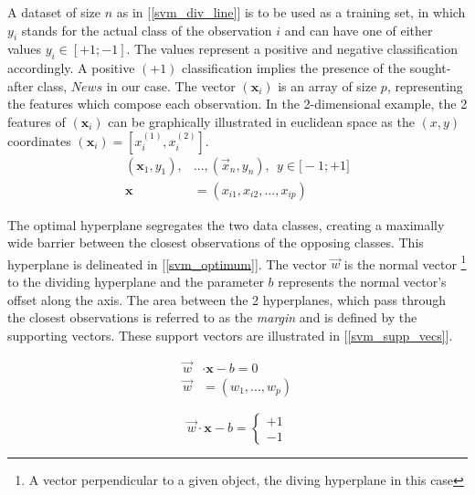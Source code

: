  A dataset of size $n$ as in [\ref{svm_div_line}] is to be used as a training set, in which $y_i$ stands for the actual class of the observation $i$ and can have one of either values $y_i \in [+1;-1] $. The values represent a positive and negative classification accordingly. A positive $(+1)$ classification implies the presence of the sought-after class, $News$ in our case. The vector $(\textbf{x}_i)$ is an array of size $p$, representing the features which compose each observation. In the 2-dimensional example, the 2 features of $(\textbf{x}_i)$ can be graphically illustrated in euclidean space as the $(x,y)$ coordinates $(\textbf{x}_i) = [x_i^{(1)},x_i^{(2)}]$. 
	\begin{equation}
		\begin{aligned}
			(\textbf{x}_1,y_1),& ... , (\vec{x}_n,y_n), \ \ y \in \big[-1;+1 \big] \\
			\textbf{x}& = (x_{i1},x_{i2}, ...,x_{ip})
		\end{aligned}
	\label{svm_div_line}
	\end{equation}
	
	The optimal hyperplane segregates the two data classes, creating a maximally wide barrier between the closest observations of the opposing classes. This hyperplane is delineated in [\ref{svm_optimum}]. The vector $\vec{w}$ is the normal vector \footnote{A vector perpendicular to a given object, the diving hyperplane in this case} to the dividing hyperplane and the parameter $b$ represents the normal vector's offset along the axis. The area between the 2 hyperplanes, which pass through the closest observations is referred to as the \textit{margin} and is defined by the supporting vectors. These support vectors are illustrated in [\ref{svm_supp_vecs}].
	
	\begin{equation}
		\begin{aligned}
			\vec{w}& \cdot \textbf{x} - b = 0 \\
			\vec{w}& = (w_1, ... , w_p) 
		\end{aligned}
		\label{svm_optimum}
	\end{equation}
	
	\begin{equation}
		\vec{w} \cdot \textbf{x} - b = 
		\begin{cases}
			+1 \\
			-1 
		\end{cases}
		\label{svm_supp_vecs}
	\end{equation}
	
